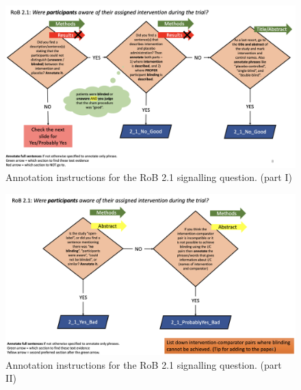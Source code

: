 \documentclass[sn-mathphys,Numbered]{sn-jnl}%
\begin{document}
%
%
%
\begin{figure}[hbt]
    \centering
    \includegraphics[width=\textwidth]{figures/2_1.png}
    \caption{Annotation instructions for the RoB 2.1 signalling question. (part I)}
    \label{fig:2_1}
\end{figure}
\begin{figure}[hbt]
    \centering
    \includegraphics[width=\textwidth]{figures/2_1_1.png}
    \caption{Annotation instructions for the RoB 2.1 signalling question. (part II)}
    \label{fig:2_1_1}
\end{figure}
%
%
%
\end{document}
